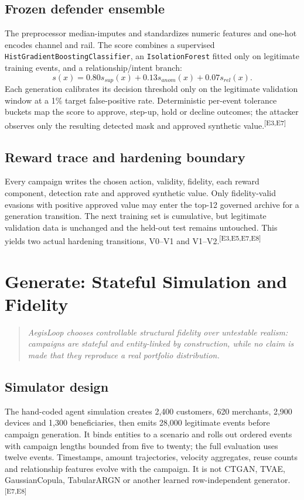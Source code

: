 \documentclass[11pt,a4paper,oneside]{article}
\newcommand{\evidence}[1]{\textsuperscript{\textcolor{EvidenceGray}{[#1]}}}
\newcommand{\sectionlead}[1]{\begin{quote}\itshape #1\end{quote}}
\begin{document}
\subsection{Frozen defender ensemble}
The preprocessor median-imputes and standardizes numeric features and one-hot encodes channel and rail. The score combines a supervised \texttt{HistGradientBoostingClassifier}, an \texttt{IsolationForest} fitted only on legitimate training events, and a relationship/intent branch:
\[
  s(x)=0.80s_{sup}(x)+0.13s_{anom}(x)+0.07s_{rel}(x).
\]
Each generation calibrates its decision threshold only on the legitimate validation window at a 1\% target false-positive rate. Deterministic per-event tolerance buckets map the score to approve, step-up, hold or decline outcomes; the attacker observes only the resulting detected mask and approved synthetic value.\evidence{E3,E7}

\subsection{Reward trace and hardening boundary}
Every campaign writes the chosen action, validity, fidelity, each reward component, detection rate and approved synthetic value. Only fidelity-valid evasions with positive approved value may enter the top-12 governed archive for a generation transition. The next training set is cumulative, but legitimate validation data is unchanged and the held-out test remains untouched. This yields two actual hardening transitions, V0--V1 and V1--V2.\evidence{E3,E5,E7,E8}

\section{Generate: Stateful Simulation and Fidelity}
\sectionlead{AegisLoop chooses controllable structural fidelity over untestable realism: campaigns are stateful and entity-linked by construction, while no claim is made that they reproduce a real portfolio distribution.}

\subsection{Simulator design}
The hand-coded agent simulation creates 2,400 customers, 620 merchants, 2,900 devices and 1,300 beneficiaries, then emits 28,000 legitimate events before campaign generation. It binds entities to a scenario and rolls out ordered events with campaign lengths bounded from five to twenty; the full evaluation uses twelve events. Timestamps, amount trajectories, velocity aggregates, reuse counts and relationship features evolve with the campaign. It is not CTGAN, TVAE, GaussianCopula, TabularARGN or another learned row-independent generator.\evidence{E7,E8}
\end{document}
